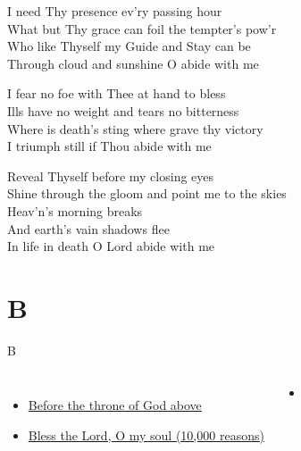 \documentclass{beamer}
\begin{document}
{\hypertarget{Abide with me[]3}{}
\begin{frame}{}
\fontsize{ 15 }{ 19 }\selectfont

I need Thy presence ev'ry passing hour\\ 
What but Thy grace can foil the tempter's pow'r\\ 
Who like Thyself my Guide and Stay can be\\ 
Through cloud and sunshine O abide with me 

\end{frame}

\hypertarget{Abide with me[]4}{}
\begin{frame}{}
\fontsize{ 15 }{ 19 }\selectfont

I fear no foe with Thee at hand to bless\\ 
Ills have no weight and tears no bitterness\\ 
Where is death's sting where grave thy victory\\ 
I triumph still if Thou abide with me 

\end{frame}

\hypertarget{Abide with me[]5}{}
\begin{frame}{}
\fontsize{ 15 }{ 19 }\selectfont

Reveal Thyself before my closing eyes\\ 
Shine through the gloom and point me to the skies\\ 
Heav'n's morning breaks\\ 
And earth's vain shadows flee\\ 
In life in death O Lord abide with me 

\end{frame}

}
\section{B}

\begin{frame}{B}
\begin{columns}
        \begin{itemize}
    \item \hyperlink{Before the throne of God above[]}{Before the throne of God above } \phantom{ 1 1}
    \item \hyperlink{10,000 reasons['Bless the Lord, O my soul']}{Bless the Lord, O my soul (10,000 reasons)} \phantom{}
\end{itemize}
        \begin{itemize}
            \item[] \phantom{1}\end{itemize}


\end{columns}

\end{frame}
\end{document}
